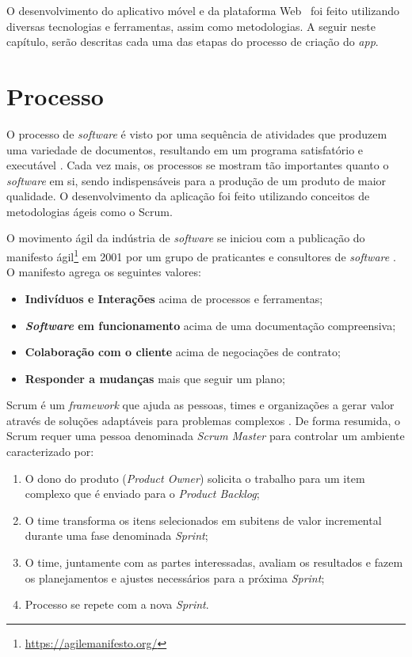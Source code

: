 O desenvolvimento do aplicativo móvel e da plataforma Web \appName\ foi feito utilizando diversas tecnologias e ferramentas, assim como metodologias. A seguir neste capítulo, serão descritas cada uma das etapas do processo de criação do \textit{app}.

\section{Processo}

O processo de \textit{software} é visto por uma sequência de atividades
que produzem uma variedade de documentos, resultando em um programa
satisfatório e executável \cite{processos_software}. Cada vez mais, os processos se mostram tão importantes quanto o \textit{software} em si, sendo indispensáveis para a produção de um produto de maior qualidade. O desenvolvimento da aplicação foi feito utilizando conceitos de metodologias ágeis como o Scrum.

O movimento ágil da indústria de \textit{software} se iniciou com a publicação do manifesto ágil\footnote{\url{https://agilemanifesto.org/}} em 2001 por um grupo de praticantes e consultores de \textit{software} \cite{agile_software_development}. O manifesto agrega os seguintes valores:

\begin{itemize}
    \item \textbf{Indivíduos e Interações} acima de processos e ferramentas;
    \item \textbf{\textit{Software} em funcionamento} acima de uma documentação compreensiva;
    \item \textbf{Colaboração com o cliente} acima de negociações de contrato;
    \item \textbf{Responder a mudanças} mais que seguir um plano;
\end{itemize}

Scrum é um \textit{framework} que ajuda as pessoas, times e organizações a gerar valor através de soluções adaptáveis para problemas complexos \cite{scrum_guide}. De forma resumida, o Scrum requer uma pessoa denominada \textit{Scrum Master} para controlar um ambiente caracterizado por:

\begin{enumerate}
    \item O dono do produto (\textit{Product Owner}) solicita o trabalho para um item complexo que é enviado para o \textit{Product Backlog};
    \item O time transforma os itens selecionados em subitens de valor incremental durante uma fase denominada \textit{Sprint};
    \item O time, juntamente com as partes interessadas, avaliam os resultados e fazem os planejamentos e ajustes necessários para a próxima \textit{Sprint};
    \item Processo se repete com a nova \textit{Sprint}.
\end{enumerate}

